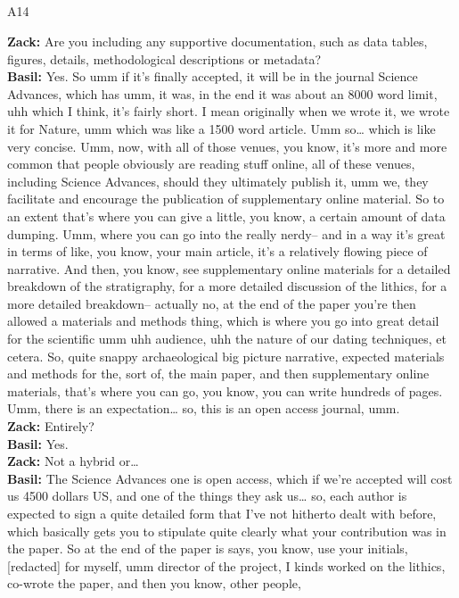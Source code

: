 \documentclass[
  canadian,
]{article}
\makeatletter
\let\oldsubparagraph\subparagraph
\renewcommand{\subparagraph}{
    \@ifstar
      \xxxSubParagraphStar
      \xxxSubParagraphNoStar
  }
\newcommand{\xxxSubParagraphStar}[1]{\oldsubparagraph*{#1}\mbox{}}
\newcommand{\xxxSubParagraphNoStar}[1]{\oldsubparagraph{#1}\mbox{}}
\makeatother
\begin{document}
\subparagraph{A14}\label{sec-A14}

\textbf{Zack:} Are you including any supportive documentation, such as
data tables, figures, details, methodological descriptions or
metadata?\\
\textbf{Basil:} Yes. So umm if it's finally accepted, it will be in the
journal Science Advances, which has umm, it was, in the end it was about
an 8000 word limit, uhh which I think, it's fairly short. I mean
originally when we wrote it, we wrote it for Nature, umm which was like
a 1500 word article. Umm so\ldots{} which is like very concise. Umm,
now, with all of those venues, you know, it's more and more common that
people obviously are reading stuff online, all of these venues,
including Science Advances, should they ultimately publish it, umm we,
they facilitate and encourage the publication of supplementary online
material. So to an extent that's where you can give a little, you know,
a certain amount of data dumping. Umm, where you can go into the really
nerdy-- and in a way it's great in terms of like, you know, your main
article, it's a relatively flowing piece of narrative. And then, you
know, see supplementary online materials for a detailed breakdown of the
stratigraphy, for a more detailed discussion of the lithics, for a more
detailed breakdown-- actually no, at the end of the paper you're then
allowed a materials and methods thing, which is where you go into great
detail for the scientific umm uhh audience, uhh the nature of our dating
techniques, et cetera. So, quite snappy archaeological big picture
narrative, expected materials and methods for the, sort of, the main
paper, and then supplementary online materials, that's where you can go,
you know, you can write hundreds of pages. Umm, there is an
expectation\ldots{} so, this is an open access journal, umm.\\
\textbf{Zack:} Entirely?\\
\textbf{Basil:} Yes.\\
\textbf{Zack:} Not a hybrid or\ldots{}\\
\textbf{Basil:} The Science Advances one is open access, which if we're
accepted will cost us 4500 dollars US, and one of the things they ask
us\ldots{} so, each author is expected to sign a quite detailed form
that I've not hitherto dealt with before, which basically gets you to
stipulate quite clearly what your contribution was in the paper. So at
the end of the paper is says, you know, use your initials,
{[}redacted{]} for myself, umm director of the project, I kinds worked
on the lithics, co-wrote the paper, and then you know, other people,
\end{document}
